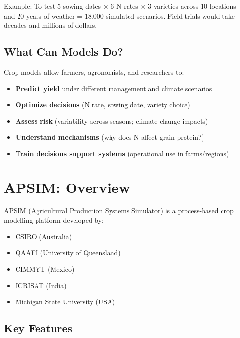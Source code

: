 Example: To test 5 sowing dates × 6 N rates × 3 varieties across 10 locations and 20 years of weather = 18,000 simulated scenarios. Field trials would take decades and millions of dollars.

\subsection{What Can Models Do?}

\begin{tipbox}
Crop models allow farmers, agronomists, and researchers to:
\begin{itemize}
  \item \textbf{Predict yield} under different management and climate scenarios
  \item \textbf{Optimize decisions} (N rate, sowing date, variety choice)
  \item \textbf{Assess risk} (variability across seasons; climate change impacts)
  \item \textbf{Understand mechanisms} (why does N affect grain protein?)
  \item \textbf{Train decisions support systems} (operational use in farms/regions)
\end{itemize}
\end{tipbox}

\section{APSIM: Overview}

APSIM (Agricultural Production Systems Simulator) is a process-based crop modelling platform developed by:
\begin{itemize}
  \item CSIRO (Australia)
  \item QAAFI (University of Queensland)
  \item CIMMYT (Mexico)
  \item ICRISAT (India)
  \item Michigan State University (USA)
\end{itemize}

\subsection{Key Features}

